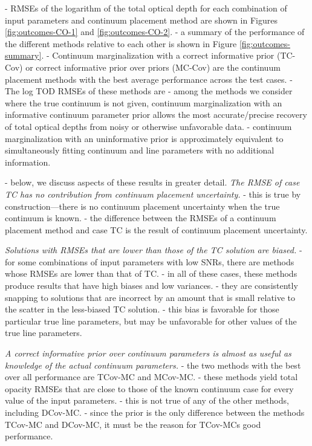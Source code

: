 \documentclass[trackchanges]{aastex62}
\begin{document}
{- RMSEs of the logarithm of the total optical depth for each combination of input parameters and continuum placement method are shown in Figures \ref{fig:outcomes-CO-1} and \ref{fig:outcomes-CO-2}.
- a summary of the performance of the different methods relative to each other is shown in Figure \ref{fig:outcomes-summary}.
- Continuum marginalization with a correct informative prior (TC-Cov) or correct informative prior over priors (MC-Cov) are the continuum placement methods with the best average performance across the test cases.
- The log TOD RMSEs of these methods are
- among the methods we consider where the true continuum is not given, continuum marginalization with an informative continuum parameter prior allows the most accurate/precise recovery of total optical depths from noisy or otherwise unfavorable data.
- continuum marginalization with an uninformative prior is approximately equivalent to simultaneously fitting continuum and line parameters with no additional information.

- below, we discuss aspects of these results in greater detail.
\emph{The RMSE of case TC has no contribution from continuum placement uncertainty.}
- this is true by construction---there is no continuum placement uncertainty when the true continuum is known.
- the difference between the RMSEs of a continuum placement method and case TC is the result of continuum placement uncertainty.

\emph{Solutions with RMSEs that are lower than those of the TC solution are biased.}
- for some combinations of input parameters with low SNRs, there are methods whose RMSEs are lower than that of TC.
- in all of these cases, these methods produce results that have high biases and low variances.
- they are consistently snapping to solutions that are incorrect by an amount that is small relative to the scatter in the less-biased TC solution.
- this bias is favorable for those particular true line parameters, but may be unfavorable for other values of the true line parameters.

\emph{A correct informative prior over continuum parameters is almost as useful as knowledge of the actual continuum parameters.}
- the two methods with the best over all performance are TCov-MC and MCov-MC.
- these methods yield total opacity RMSEs that are close to those of the known continuum case for every value of the input parameters.
- this is not true of any of the other methods, including DCov-MC.
- since the prior is the only difference between the methods TCov-MC and DCov-MC, it must be the reason for TCov-MCs good performance.

}
\end{document}
